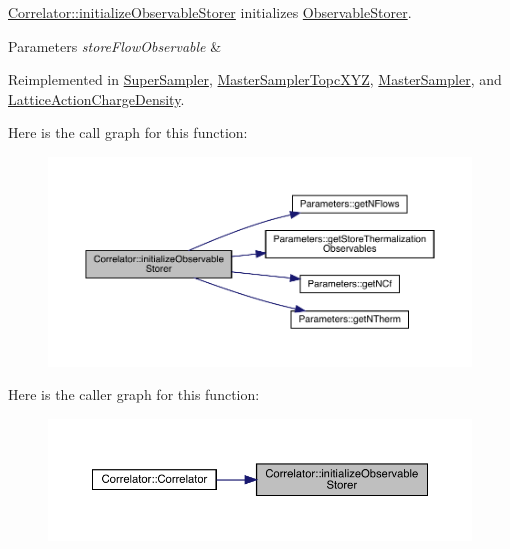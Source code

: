 \mbox{\hyperlink{class_correlator_ab99886c09dd27dfc8676d0032cecf9bc}{Correlator\+::initialize\+Observable\+Storer}} initializes \mbox{\hyperlink{class_observable_storer}{Observable\+Storer}}. 


\begin{DoxyParams}{Parameters}
{\em store\+Flow\+Observable} & \\
\hline
\end{DoxyParams}


Reimplemented in \mbox{\hyperlink{class_super_sampler_a4429d6ae37247a02259bc0c6d665821c}{Super\+Sampler}}, \mbox{\hyperlink{class_master_sampler_topc_x_y_z_af6d2cf2023d9626908fd26b07a7a0b84}{Master\+Sampler\+Topc\+X\+YZ}}, \mbox{\hyperlink{class_master_sampler_a88e2eec68ea6bd60cc3f375ac04a8ded}{Master\+Sampler}}, and \mbox{\hyperlink{class_lattice_action_charge_density_aba3131bbe5bd930adccc2852b4d44bb9}{Lattice\+Action\+Charge\+Density}}.

Here is the call graph for this function\+:
\nopagebreak
\begin{figure}[H]
\begin{center}
\leavevmode
\includegraphics[width=350pt]{class_correlator_ab99886c09dd27dfc8676d0032cecf9bc_cgraph}
\end{center}
\end{figure}
Here is the caller graph for this function\+:
\nopagebreak
\begin{figure}[H]
\begin{center}
\leavevmode
\includegraphics[width=350pt]{class_correlator_ab99886c09dd27dfc8676d0032cecf9bc_icgraph}
\end{center}
\end{figure}
\mbox{\label{class_correlator_ac7c5a07d7cbee97c417a1659b93083b2}} 
